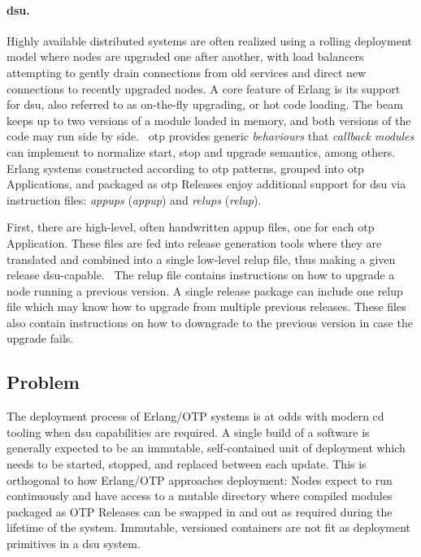 \paragraph{\acrlong{dsu}.} Highly available distributed systems are often realized using a rolling deployment model where nodes are upgraded one after another, with load balancers attempting to gently drain connections from old services and direct new connections to recently upgraded nodes. A core feature of Erlang is its support for \acrfull{dsu}, also referred to as on-the-fly upgrading, or hot code loading. The \acrshort{beam} keeps up to two versions of a module loaded in memory, and both versions of the code may run side by side.~\cite{cesarini:otp} \acrshort{otp} provides generic \emph{behaviours} that \emph{callback modules} can implement to normalize start, stop and upgrade semantics, among others.~\cite{doc:otp} Erlang systems constructed according to \acrshort{otp} patterns, grouped into \acrshort{otp} Applications, and packaged as \acrshort{otp} Releases enjoy additional support for \acrshort{dsu} via instruction files: \emph{\acrshort{appup}s} (\emph{\acrlong{appup}}) and \emph{\acrshort{relup}s} (\emph{\acrlong{relup}}).

First, there are high-level, often handwritten \acrfull{appup} files, one for each \acrshort{otp} Application. These files are fed into release generation tools where they are translated and combined into a single low-level \acrshort{relup} file, thus making a given release \acrshort{dsu}-capable.~\cite{doc:otp} The \acrshort{relup} file contains instructions on how to upgrade a node running a previous version. A single release package can include one \acrshort{relup} file which may know how to upgrade from multiple previous releases. These files also contain instructions on how to downgrade to the previous version in case the upgrade fails.~\cite{doc:otp}

\subsection{Problem}\label{sec:problem}
The deployment process of Erlang/OTP systems is at odds with modern \acrfull{cd} tooling when \acrshort{dsu} capabilities are required. A single build of a software is generally expected to be an immutable, self-contained unit of deployment which needs to be started, stopped, and replaced between each update. This is orthogonal to how Erlang/OTP approaches deployment: Nodes expect to run continuously and have access to a mutable directory where compiled modules packaged as OTP Releases can be swapped in and out as required during the lifetime of the system. Immutable, versioned containers are not fit as deployment primitives in a \acrshort{dsu} system.

